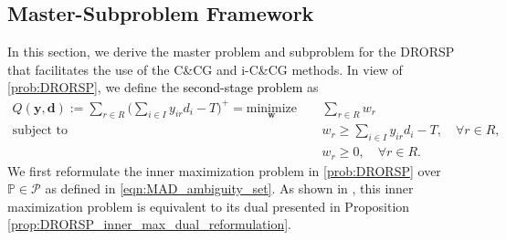\documentclass[preprint,review,11pt]{elsarticle}
\theoremstyle{definition}
\theoremstyle{remark}
\newcommand{\Prob}{\mathbb{P}}
\newcommand{\calP}{\mathcal{P}}
\newcommand{\yb}{\pmb{y}}
\newcommand{\db}{\pmb{d}}
\newcommand{\wb}{\pmb{w}}
\newcommand{\blue}{\textcolor{black}}
\begin{document}
\subsection{Master-Subproblem Framework}  \label{appdx:DRORSP_MS_framework}
In this section, we derive the master problem and subproblem for the DRORSP that facilitates the use of the C\&CG and i-C\&CG methods. In view of \eqref{prob:DRORSP}, we define the \blue{second-stage problem} as
%
\begin{subequations}
\begin{align}
Q(\yb,\db):=\sum_{r\in R}\Bigg(\sum_{i\in I} y_{ir}d_i - T\Bigg)^+ =\underset{\wb}{\text{minimize}}\, \quad
&  \sum_{r\in R} w_r\\
\text{subject to} \quad
& w_r \geq \sum_{i\in I}y_{ir}d_i - T,\quad\forall r\in R, \\
& w_r \geq 0,\quad\forall r\in R.
\end{align} \label{prob:DRORSP_SS}%
\end{subequations}
%
We first reformulate the inner maximization problem in \eqref{prob:DRORSP} over $\Prob\in\calP$ as defined in \eqref{eqn:MAD_ambiguity_set}. As shown in , this inner maximization problem is equivalent to its dual presented in Proposition \ref{prop:DRORSP_inner_max_dual_reformulation}.
\end{document}
